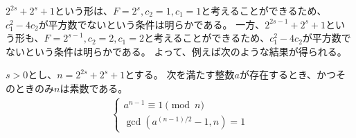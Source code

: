$2^{2s}+2^s+1$という形は、$F=2^s,c_2=1,c_1=1$と考えることができるため、$c_1^2-4c_2$が平方数でないという条件は明らかである。
一方、$2^{2s-1}+2^s+1$という形も、$F=2^{s-1},c_2=2,c_1=2$と考えることができるため、$c_1^2-4c_2$が平方数でないという条件は明らかである。
よって、例えば次のような結果が得られる。

\begin{Coro}{}{}
$s>0$とし、$n=2^{2s}+2^s+1$とする。
次を満たす整数$a$が存在するとき、かつそのときのみ$n$は素数である。
\begin{align*}
\begin{cases}
a^{n-1} \equiv 1 \pmod{n}\\
\gcd(a^{(n-1)/2}-1, n) = 1
\end{cases}
\end{align*}
\end{Coro}
